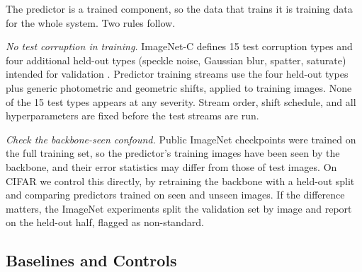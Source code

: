 \documentclass{article}
\begin{document}
The predictor is a trained component, so the data that trains it is training
data for the whole system. Two rules follow.

\emph{No test corruption in training.} ImageNet-C defines 15 test corruption
types and four additional held-out types (speckle noise, Gaussian blur,
spatter, saturate) intended for validation
\parencite{hendrycks2019imagenetc}. Predictor training streams use the four
held-out types plus generic photometric and geometric shifts, applied to
training images. None of the 15 test types appears at any severity. Stream
order, shift schedule, and all hyperparameters are fixed before the test
streams are run.

\emph{Check the backbone-seen confound.} Public ImageNet checkpoints were
trained on the full training set, so the predictor's training images have been
seen by the backbone, and their error statistics may differ from those of test
images. On CIFAR we control this directly, by retraining the backbone with a
held-out split and comparing predictors trained on seen and unseen images. If
the difference matters, the ImageNet experiments split the validation set by
image and report on the held-out half, flagged as non-standard.

\subsection{Baselines and Controls}
\label{sec:baselines}
\end{document}
